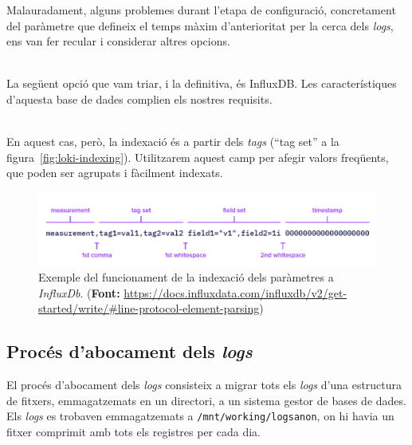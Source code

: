 \noindent
Malauradament, alguns problemes durant l’etapa de configuració, concretament del paràmetre que defineix el temps màxim d'anterioritat per la cerca dels \textit{\gls{log}s}, ens van fer recular i considerar altres opcions.

\noindent \\
La següent opció que vam triar, i la definitiva, és InfluxDB.
Les característiques d'aquesta base de dades complien els nostres requisits.

\noindent \\
En aquest cas, però, la indexació és a partir dels \textit{tags} (``tag set'' a la figura~\ref{fig:loki-indexing}).
Utilitzarem aquest camp per afegir valors freqüents, que poden ser agrupats i fàcilment indexats.

\begin{figure}[htbp]
    \centerline{\includegraphics[width=1\textwidth]{figures/influxdb-indexing}}
    \captionsetup{justification=centering}
    \caption[Exemple del funcionament de la indexació dels paràmetres a \textit{InfluxDb}.]{Exemple del funcionament de la indexació dels paràmetres a \textit{InfluxDb}. (\textbf{Font:} \url{https://docs.influxdata.com/influxdb/v2/get-started/write/\#line-protocol-element-parsing})}\label{fig:influxdb-indexing}
\end{figure}

\clearpage

\subsection{Procés d'abocament dels \textit{\gls{log}s}}\label{subsec:log-push}

\noindent
El procés d’abocament dels \textit{\gls{log}s} consisteix a migrar tots els \textit{\gls{log}s} d’una estructura de fitxers, emmagatzemats en un directori, a un sistema gestor de bases de dades. \\

\noindent
Els \textit{\gls{log}s} es trobaven emmagatzemats a \texttt{/mnt/working/logsanon}, on hi havia un fitxer comprimit amb tots els registres per cada dia. \\

